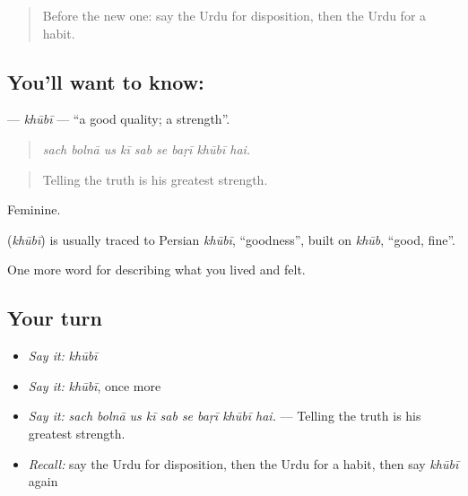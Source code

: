 \begin{quote}
Before the new one: say the Urdu for disposition, then the Urdu for a habit.
\end{quote}

\subsection*{You'll want to know: }
\textbf{} — \emph{khūbī} — \textquotedblleft{}a good quality; a strength\textquotedblright{}.

\begin{quote}
        
\end{quote}

\begin{quote}
\emph{sach bolnā us kī sab se baṛī khūbī hai.}
\end{quote}

\begin{quote}
Telling the truth is his greatest strength.
\end{quote}

Feminine.

\begin{cousinweb}
\textbf{} (\emph{khūbī}) is usually traced to Persian \emph{khūbī}, \textquotedblleft{}goodness\textquotedblright{}, built on \emph{khūb}, \textquotedblleft{}good, fine\textquotedblright{}.
\end{cousinweb}

\begin{grammarlens}[title={What you've built}]
One more word for describing what you lived and felt.
\end{grammarlens}

\subsection*{Your turn}
\begin{itemize}
\raggedright
  \item \emph{Say it:} \emph{khūbī}
  \item \emph{Say it:} \emph{khūbī}, once more
  \item \emph{Say it:} \emph{sach bolnā us kī sab se baṛī khūbī hai.} — Telling the truth is his greatest strength.
  \item \emph{Recall:} say the Urdu for disposition, then the Urdu for a habit, then say \emph{khūbī} again
\end{itemize}

